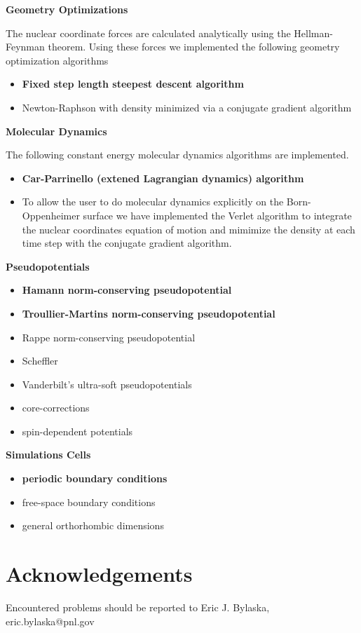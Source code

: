 \large
\textbf{Geometry Optimizations}
\normalsize

The nuclear coordinate forces are calculated analytically using the 
Hellman-Feynman theorem.  Using these forces we implemented the following
geometry optimization algorithms
\begin{itemize}
	\item \textbf{Fixed step length steepest descent algorithm}
	\item Newton-Raphson with density minimized via a conjugate
	      gradient algorithm
\end{itemize}

\large
\textbf{Molecular Dynamics}
\normalsize

The following constant energy molecular dynamics algorithms are implemented.
\begin{itemize}
	\item \textbf{Car-Parrinello (extened Lagrangian dynamics) algorithm}
	\item To allow the user to do molecular dynamics explicitly on
	      the Born-Oppenheimer surface we have implemented the Verlet
	      algorithm to integrate the nuclear coordinates equation of
	      motion and mimimize the density at each time step with
	      the conjugate gradient algorithm.
\end{itemize}

\large
\textbf{Pseudopotentials}
\normalsize

\begin{itemize}
	\item \textbf{Hamann norm-conserving pseudopotential}
	\item \textbf{Troullier-Martins norm-conserving pseudopotential}
	\item Rappe norm-conserving pseudopotential
	\item Scheffler
	\item Vanderbilt's ultra-soft pseudopotentials
	\item core-corrections	
	\item spin-dependent potentials
\end{itemize}


\large
\textbf{Simulations Cells}
\normalsize

\begin{itemize}
	\item \textbf{periodic boundary conditions}
	\item free-space boundary conditions
	\item general orthorhombic dimensions
\end{itemize}

\section{Acknowledgements}

Encountered problems should be reported to 
Eric J. Bylaska, eric.bylaska@pnl.gov




